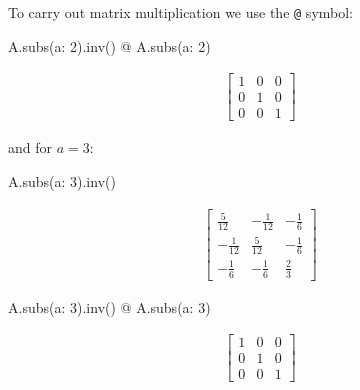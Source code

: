 To carry out matrix multiplication we use the \texttt{@} symbol:




\begin{pyin}
A.subs({a: 2}).inv() @ A.subs({a: 2})
\end{pyin}




\begin{equation*}
\begin{split}\displaystyle \left[\begin{matrix}1 & 0 & 0\\0 & 1 & 0\\0 & 0 & 1\end{matrix}\right]\end{split}
\end{equation*}




and for \(a = 3\):




\begin{pyin}
A.subs({a: 3}).inv()
\end{pyin}




\begin{equation*}
\begin{split}\displaystyle \left[\begin{matrix}\frac{5}{12} & - \frac{1}{12} & - \frac{1}{6}\\- \frac{1}{12} & \frac{5}{12} & - \frac{1}{6}\\- \frac{1}{6} & - \frac{1}{6} & \frac{2}{3}\end{matrix}\right]\end{split}
\end{equation*}






\begin{pyin}
A.subs({a: 3}).inv() @ A.subs({a: 3})
\end{pyin}




\begin{equation*}
\begin{split}\displaystyle \left[\begin{matrix}1 & 0 & 0\\0 & 1 & 0\\0 & 0 & 1\end{matrix}\right]\end{split}
\end{equation*}





